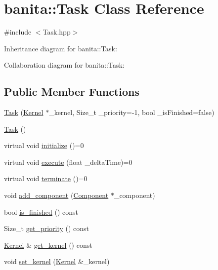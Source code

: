 \hypertarget{classbanita_1_1_task}{}\section{banita\+::Task Class Reference}
\label{classbanita_1_1_task}


{\ttfamily \#include $<$Task.\+hpp$>$}



Inheritance diagram for banita\+::Task\+:


Collaboration diagram for banita\+::Task\+:
\subsection*{Public Member Functions}
\begin{DoxyCompactItemize}
\item 
\mbox{\hyperlink{classbanita_1_1_task_ae212c6c6b6f007e953ba8406d82528be}{Task}} (\mbox{\hyperlink{classbanita_1_1_kernel}{Kernel}} $\ast$\+\_\+kernel, Size\+\_\+t \+\_\+priority=-\/1, bool \+\_\+is\+Finished=false)
\item 
\mbox{\hyperlink{classbanita_1_1_task_add906131c42cec4d75df03eceeb870e6}{Task}} ()
\item 
virtual void \mbox{\hyperlink{classbanita_1_1_task_a34578cdd41899a338ac09fec3a285487}{initialize}} ()=0
\item 
virtual void \mbox{\hyperlink{classbanita_1_1_task_aa79a45c9cbfac80ec9e4f060d5d444aa}{execute}} (float \+\_\+delta\+Time)=0
\item 
virtual void \mbox{\hyperlink{classbanita_1_1_task_acccbd449402b1e9ce1ba34c26333a1b6}{terminate}} ()=0
\item 
void \mbox{\hyperlink{classbanita_1_1_task_ab0d9e75daff35c07cdb6bea71d0bf605}{add\+\_\+component}} (\mbox{\hyperlink{classbanita_1_1_component}{Component}} $\ast$\+\_\+component)
\item 
bool \mbox{\hyperlink{classbanita_1_1_task_a46dfe5e26db0311f2a4bc7630bc0e2b7}{is\+\_\+finished}} () const
\item 
Size\+\_\+t \mbox{\hyperlink{classbanita_1_1_task_a8b798d792fefb09525e48eb836a8cbb7}{get\+\_\+priority}} () const
\item 
\mbox{\hyperlink{classbanita_1_1_kernel}{Kernel}} \& \mbox{\hyperlink{classbanita_1_1_task_acce4efa4b9ded5502ee9a70093f87855}{get\+\_\+kernel}} () const
\item 
void \mbox{\hyperlink{classbanita_1_1_task_a2f8babba8f085c5a65b58eaf2f73c121}{set\+\_\+kernel}} (\mbox{\hyperlink{classbanita_1_1_kernel}{Kernel}} \&\+\_\+kernel)

\end{DoxyCompactItemize}
